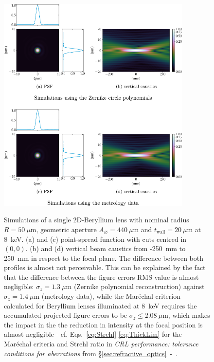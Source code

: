 \begin{refsection}
\begin{figure}[t]
        \centering
        {\includegraphics[height=11cm]{figures/ch04/metrology_zernike_simualtions.pdf}}
        \caption[Effects of other sources of deviations from the parabolic shape]{Simulations of a single 2D-Beryllium lens with nominal radius $R=50~\mu\text{m}$, geometric aperture $A_{\diameter}=440~\mu\text{m}$ and $t_\text{wall}=20~\mu$m at 8~keV. (a) and (c) point-spread function with cuts centred in $(0,0)$. (b) and (d) vertical beam caustics from -250~mm to 250~mm in respect to the focal plane. The difference between both profiles is almost not perceivable. This can be explained by the fact that the difference between the figure errors RMS value is almost negligible:  $\sigma_z=1.3~\mu$m (Zernike polynomial reconstruction) against $\sigma_z=1.4~\mu$m (metrology data), while the Mar\'echal criterion calculated for Beryllium lenses illuminated at $8$~keV requires the accumulated projected figure errors to be $\sigma_z\leq2.08~\mu$m, which makes the impact in the the reduction in intensity at the focal position is almost negligible - cf. Eqs.~\ref{eq:Strehl}-\ref{eq:ThickLim} for the Mar\'echal criteria and Strehl ratio in \textit{CRL performance: tolerance conditions for aberrations} from \S\ref{sec:refractive_optics}~-~\textit{}.}\label{fig:metrology_zernike_simualtions}
\end{figure}


\end{refsection}
